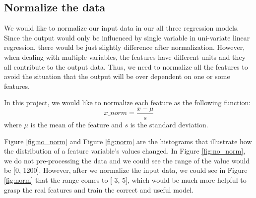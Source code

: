 \documentclass{article}
\begin{document}
\subsection{Normalize the data}
We would like to normalize our input data in our all three regression models. Since the output would only be influenced by single variable in uni-variate linear regression, there would be just slightly difference after normalization. However, when dealing with multiple variables, the features have different units and they all contribute to the output data. Thus, we need to normalize all the features to avoid the situation that the output will be over dependent on one or some features.

In this project, we would like to normalize each feature as the following function:
\begin{equation*}
  x\_norm = \frac{x - \mu}{s}
\end{equation*}
where $\mu$ is the mean of the feature and $s$ is the standard deviation.

Figure \ref{fig:no_norm} and Figure \ref{fig:norm} are the histograms that illustrate how the distribution of a feature variable’s values changed. In Figure \ref{fig:no_norm}, we do not pre-processing the data and we could see the range of the value would be [0, 1200]. However, after we normalize the input data, we could see in Figure \ref{fig:norm} that the range comes to [-3, 5], which would be much more helpful to grasp the real features and train the correct and useful model.
\end{document}
